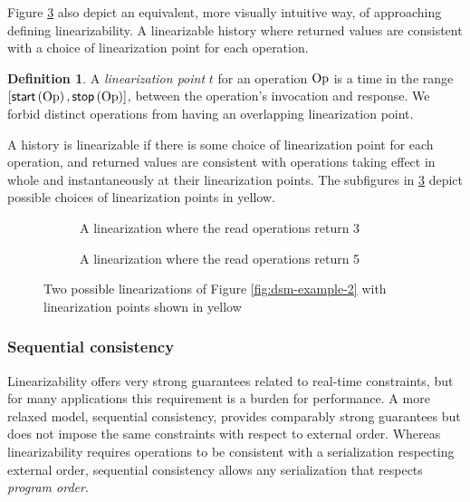 \documentclass[]             %
{NASA}                       %
\theoremstyle{definition}
\newtheorem{definition}[theorem]{Definition}
\begin{document}
Figure \ref{fig:dsm-example-2-linearizations} also depict an
equivalent, more visually intuitive way, of approaching defining
linearizability. A linearizable history where returned values are
consistent with a choice of linearization point for each operation.
\begin{definition}
  A \emph{linearization point} $t$ for an operation $\mathrm{Op}$ is a time in
  the range $[\mathsf{start}\left(\mathrm{Op}\right), \mathsf{stop}\left(\mathrm{Op}\right)]$, between the operation's
  invocation and response. We forbid distinct operations from having
  an overlapping linearization point.
\end{definition}

A history is linearizable if there is some choice of linearization
point for each operation, and returned values are consistent with
operations taking effect in whole and instantaneously at their
linearization points. The subfigures in
\ref{fig:dsm-example-2-linearizations} depict possible choices of
linearization points in yellow.

\begin{figure}
  \begin{subfigure}{1\textwidth}
    \setlength\belowcaptionskip{4ex}
    \centering
    
    \caption{A linearization where the read operations return 3}
    \label{fig:dsm-example-2-linearizations-1}
  \end{subfigure}
  \begin{subfigure}{1\textwidth}
    
        \caption{A linearization where the read operations return 5}
    \label{fig:dsm-example-2-linearizations-b}
  \end{subfigure}
  \caption{Two possible linearizations of Figure \ref{fig:dsm-example-2} with linearization points shown in yellow}
  \label{fig:dsm-example-2-linearizations}
\end{figure}

\subsubsection{Sequential consistency}
\label{sequential-consistency}

Linearizability offers very strong guarantees related to real-time
constraints, but for many applications this requirement is a burden
for performance. A more relaxed model, sequential consistency,
provides comparably strong guarantees but does not impose the same
constraints with respect to external order. Whereas linearizability
requires operations to be consistent with a serialization respecting
external order, sequential consistency allows any serialization that
respects \emph{program order}.
\end{document}
